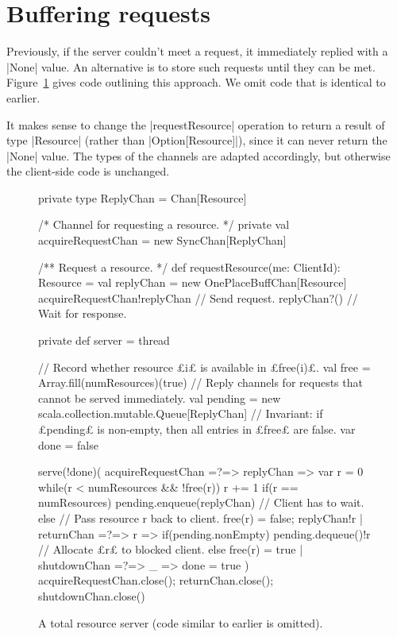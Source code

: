 
\section{Buffering requests}

Previously, if the server couldn't meet a request, it immediately replied with
a |None| value.  An alternative is to store such requests until they can be
met.  
%
Figure~\ref{fig:totalRAServer} gives code outlining this approach.  We omit
code that is identical to earlier.

It makes sense to change the |requestResource| operation to return a result of
type |Resource| (rather than |Option[Resource]|), since it can never return
the |None| value.  The types of the channels are adapted accordingly, but
otherwise the client-side code is unchanged.


\begin{figure}
\begin{scala}
  private type ReplyChan = Chan[Resource]

  /* Channel for requesting a resource. */
  private val acquireRequestChan = new SyncChan[ReplyChan]

  /** Request a resource. */
  def requestResource(me: ClientId): Resource = {
    val replyChan = new OnePlaceBuffChan[Resource]
    acquireRequestChan!replyChan  // Send request.
    replyChan?() // Wait for response.
  }

  private def server = thread{
    // Record whether resource £i£ is available in £free(i)£.
    val free = Array.fill(numResources)(true)
    // Reply channels for requests that cannot be served immediately.
    val pending = new scala.collection.mutable.Queue[ReplyChan]
    // Invariant: if £pending£ is non-empty, then all entries in £free£ are false.
    var done = false

    serve(!done)(
      acquireRequestChan =?=> { replyChan =>
	var r = 0
	while(r < numResources && !free(r)) r += 1
	if(r == numResources) 
          pending.enqueue(replyChan) // Client has to wait.
        else{  // Pass resource r back to client. 
	  free(r) = false; replyChan!r
        }
      }
      | returnChan =?=> { r =>
          if(pending.nonEmpty)
            pending.dequeue()!r // Allocate £r£ to blocked client.
          else free(r) = true
      }
      | shutdownChan =?=> { _ => done = true }
    )
    acquireRequestChan.close(); returnChan.close(); shutdownChan.close()
  }
\end{scala}
\caption{A total resource server (code similar to earlier is omitted).}
\label{fig:totalRAServer}
\end{figure}

